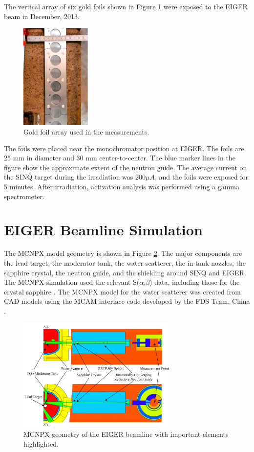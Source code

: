 \documentclass[a4paper,
              ]{jacow}
\begin{document}
The vertical array of six gold foils shown in Figure \ref{foils} were exposed to the EIGER beam in December, 2013.   

\begin{figure}[!htb]
   \centering
   \includegraphics*[width=35mm,angle=90]{graphics/foils.eps}
   \caption{Gold foil array used in the measurements.}
   \label{foils}
\end{figure}

The foils were placed near the monochromator position at EIGER.  The foils are 25 mm in diameter and 30 mm center-to-center.  The blue marker lines in the figure show the approximate extent of the neutron guide.  The average current on the SINQ target during the irradiation was $200 \mu A$, and the foils were exposed for 5 minutes.  After irradiation, activation analysis was performed using a gamma spectrometer.


\section{EIGER Beamline Simulation}

The MCNPX model geometry is shown in Figure \ref{geom}.  The major components are the lead target, the moderator tank, the water scatterer, the in-tank nozzles, the sapphire crystal, the neutron guide, and the shielding around SINQ and EIGER.  The MCNPX simulation used the relevant S($\alpha$,$\beta$) data, including those for the crystal sapphire \cite{sapp}.  The MCNPX model for the water scatterer was created from CAD models using the MCAM interface code developed by the FDS Team, China \cite{mcam}.


\begin{figure}[!htb]
   \centering
   \includegraphics*[width=80mm]{graphics/geom.pdf}
   \caption{MCNPX geometry of the EIGER beamline with important elements highlighted.}
   \label{geom}
\end{figure}
\end{document}
